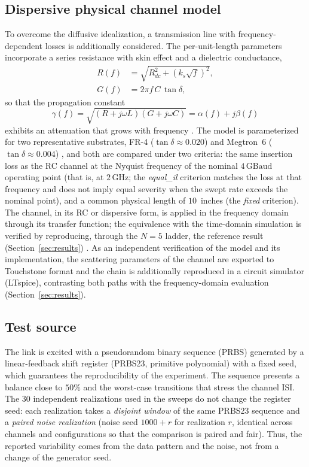 \documentclass{ieeeaccess}
\begin{document}
\subsection{Dispersive physical channel model}
To overcome the diffusive idealization, a transmission line with
frequency-dependent losses is additionally considered. The per-unit-length
parameters incorporate a series resistance with skin effect and a
dielectric conductance,
\begin{equation}
\begin{aligned}
R(f)&=\sqrt{R_{dc}^2+\left(k_s\sqrt{f}\right)^2},\\
G(f)&=2\pi f\,C\,\tan\delta,
\end{aligned}
\label{eq:rlgc}
\end{equation}
so that the propagation constant
\[
\gamma(f)=\sqrt{(R+j\omega L)(G+j\omega C)}=\alpha(f)+j\beta(f)
\]
exhibits an
attenuation that grows with frequency \cite{9888577,8861405}. The model is
parameterized for two representative substrates, FR-4
($\tan\delta\approx0.020$) and Megtron~6 ($\tan\delta\approx0.004$)
\cite{9785524,10385078}, and both are compared under two criteria: the same
insertion loss as the RC channel at the Nyquist frequency of the nominal
$4\,\mathrm{GBaud}$ operating point (that is, at $2\,\mathrm{GHz}$; the
\textit{equal\_il} criterion matches the loss at that frequency and does not
imply equal severity when the swept rate exceeds the nominal point), and a
common physical length of $10$~inches (the \textit{fixed} criterion). The
channel, in its RC or dispersive form, is applied in the frequency domain
through its transfer function; the equivalence with the time-domain
simulation is verified by reproducing, through the $N=5$ ladder, the
reference result (Section~\ref{sec:results}) \cite{7445206}. As an
independent verification of the model and its implementation, the scattering
parameters of the channel are exported to Touchstone format and the chain is
additionally reproduced in a circuit simulator (LTspice), contrasting both
paths with the frequency-domain evaluation (Section~\ref{sec:results}).

\subsection{Test source}
The link is excited with a pseudorandom binary sequence (PRBS) generated by
a linear-feedback shift register (PRBS23, primitive polynomial) with a fixed
seed, which guarantees the reproducibility of the experiment. The sequence
presents a balance close to $50\%$ and the worst-case transitions that
stress the channel ISI. The 30 independent realizations used in the sweeps
do not change the register seed: each realization takes a \emph{disjoint
window} of the same PRBS23 sequence and a \emph{paired noise realization}
(noise seed $1000{+}r$ for realization $r$, identical across channels and
configurations so that the comparison is paired and fair). Thus, the
reported variability comes from the data pattern and the noise, not from a
change of the generator seed.
\end{document}

